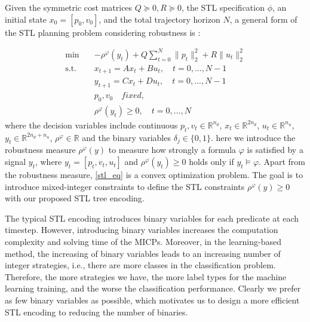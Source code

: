 \documentclass[a4paper]{report}
\begin{document}
Given the symmetric cost matrices $Q\succeq 0,R\succeq 0 $, the STL specification $\phi$, an initial state $x_0=[p_0,v_0]$, and the total trajectory horizon $N$, a general form of the STL planning problem considering robustness is :

\begin{equation}
    \label{stl_eq}%
    \begin{aligned}
        \min \quad       &  -\rho^\varphi (y_t) +  Q\sum_{t=0}^{N}  \| p_{t} \|_2^2 + R\|u_{t}\|_{2}^2 \\
        \text{s.t.}\quad &
        x_{t+1}=Ax_{t}+Bu_{t},  \quad t=0,...,N-1                                                                          \\
                         &
        y_{t+1}=Cx_t+Du_t,  \quad t=0,...,N-1 
                                                            \\
                         & p_0, v_0 \quad  fixed,                                   \\
                         & \rho^\varphi (y_t) \geq 0, \quad t=0,...,N 
    \end{aligned}
\end{equation}
where the decision variables include continuous $p_t, v_t \in \mathbb{R}^{n_d}$, $x_t \in \mathbb{R}^{2n_d}$, $u_t \in \mathbb{R}^{n_u}$, $y_t \in\mathbb{R}^{2n_d+n_u}$, $\rho^\varphi \in \mathbb{R}$ and the binary variables $\delta_j \in \{0,1\}$.
here we introduce the robustness measure $\rho^\varphi(y)$ to measure how strongly a formula $\varphi$ is satisfied by a signal $y_t$, where $y_t = [p_t,v_t,u_t]$ and $\rho^\varphi (y_t) \geq 0 $ holds only if $y_t \models  \varphi$. 
Apart from the robustness measure, \ref{stl_eq} is a convex optimization problem. The goal is to introduce mixed-integer constraints to define the STL constraints $\rho^\varphi(y) \geq 0$ with our proposed STL tree encoding. 

The typical STL encoding introduces binary variables for each predicate at each timestep. However, introducing binary variables increases the computation complexity and solving time of the MICPs. Moreover, in the learning-based method, the increasing of binary variables leads to an increasing number of integer strategies, i.e., there are more classes in the classification problem. Therefore, the more strategies we have, the more label types for the machine learning training, and the worse the classification performance. Clearly we prefer as few binary variables as possible, which motivates us to design a more efficient STL encoding to reducing the number of binaries.
\end{document}
